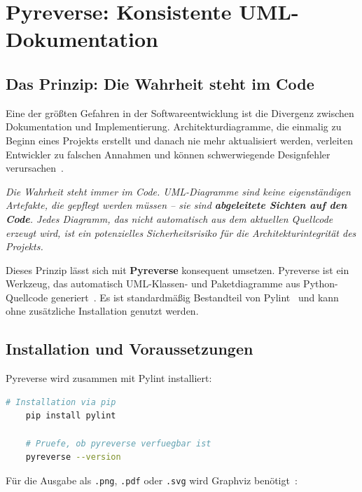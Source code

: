 ﻿\documentclass[a4paper,12pt]{article}
\begin{document}
\section{Pyreverse: Konsistente UML-Dokumentation}
\label{sec:pyreverse}

\subsection{Das Prinzip: Die Wahrheit steht im Code}

Eine der größten Gefahren in der Softwareentwicklung ist die Divergenz zwischen
Dokumentation und Implementierung. Architekturdiagramme, die einmalig zu Beginn
eines Projekts erstellt und danach nie mehr aktualisiert werden, verleiten
Entwickler zu falschen Annahmen und können schwerwiegende Designfehler
verursachen~\cite{kruchten1995}.

\textit{Die Wahrheit steht immer im Code. UML-Diagramme sind keine eigenständigen
Artefakte, die gepflegt werden müssen -- sie sind \textbf{abgeleitete Sichten auf den Code}. Jedes Diagramm, das nicht automatisch aus dem aktuellen
Quellcode erzeugt wird, ist ein potenzielles Sicherheitsrisiko für die
Architekturintegrität des Projekts.}

Dieses Prinzip lässt sich mit \textbf{Pyreverse} konsequent umsetzen. Pyreverse
ist ein Werkzeug, das automatisch UML-Klassen- und Paketdiagramme aus
Python-Quellcode generiert~\cite{pyreverse2024}. Es ist standardmäßig Bestandteil
von Pylint~\cite{pylint2024} und kann ohne zusätzliche Installation genutzt werden.

\subsection{Installation und Voraussetzungen}

Pyreverse wird zusammen mit Pylint installiert:

\begin{lstlisting}[language=bash, caption={Installation von Pylint und Pyreverse},
	label={lst:install}]
	# Installation via pip
	pip install pylint
	
	# Pruefe, ob pyreverse verfuegbar ist
	pyreverse --version
\end{lstlisting}

Für die Ausgabe als \texttt{.png}, \texttt{.pdf} oder \texttt{.svg} wird
Graphviz benötigt~\cite{graphviz2024}:
\end{document}
